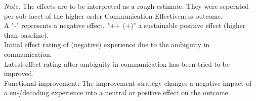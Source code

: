 \documentclass[man]{apa7}
\begin{document}
\begin{landscape}
\begin{table}
\begin{tablenotes}
{        \textit{Note.} The effects are to be interpreted as a rough estimate. They were seperated per sub-facet of the higher order Communication Effectiveness outcome.  \\
        A "-" represents a negative effect, "++ (+)" a sustainable positive effect (higher than baseline). \\
         Initial effect rating of (negative) experience due to the ambiguity in communication. \\
         Latest effect rating after ambiguity in communication has been tried to be improved. \\ 
        Functional improvement: The improvement strategy changes a negative impact of a en-/decoding experience into a neutral or positive effect on the outcome.
         }
    \end{tablenotes}
\end{table}


\end{landscape}
\end{document}

